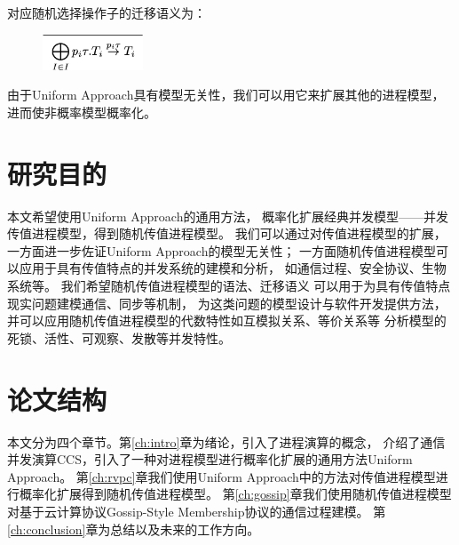    对应随机选择操作子的迁移语义为：
   \begin{figure}[!htbp]
    \small
    \centering
    \includegraphics[width=3cm]{../figures/rccs.png}
     \label{fig_rccs}
 \end{figure}

   由于Uniform Approach具有模型无关性，我们可以用它来扩展其他的进程模型，
   进而使非概率模型概率化。

\section{研究目的}
本文希望使用Uniform Approach的通用方法，
概率化扩展经典并发模型——并发传值进程模型，得到随机传值进程模型。
我们可以通过对传值进程模型的扩展，
一方面进一步佐证Uniform Approach的模型无关性；
一方面随机传值进程模型可以应用于具有传值特点的并发系统的建模和分析，
如通信过程、安全协议、生物系统等。
我们希望随机传值进程模型的语法、迁移语义
可以用于为具有传值特点现实问题建模通信、同步等机制，
为这类问题的模型设计与软件开发提供方法，
并可以应用随机传值进程模型的代数特性如互模拟关系、等价关系等
分析模型的死锁、活性、可观察、发散等并发特性。

\section{论文结构}
本文分为四个章节。第\ref{ch:intro}章为绪论，引入了进程演算的概念，
介绍了通信并发演算CCS，引入了一种对进程模型进行概率化扩展的通用方法Uniform Approach。
第\ref{ch:rvpc}章我们使用Uniform Approach中的方法对传值进程模型进行概率化扩展得到随机传值进程模型。
第\ref{ch:gossip}章我们使用随机传值进程模型对基于云计算协议Gossip-Style Membership协议的通信过程建模。
第\ref{ch:conclusion}章为总结以及未来的工作方向。
